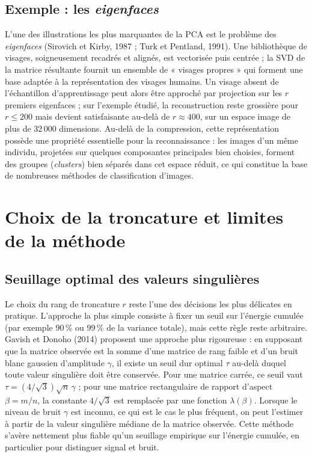 \documentclass[11pt,a4paper]{article}
\begin{document}
\subsection{Exemple : les \emph{eigenfaces}}

L'une des illustrations les plus marquantes de la PCA est le problème des \emph{eigenfaces} (Sirovich et Kirby, 1987 ; Turk et Pentland, 1991). Une bibliothèque de visages, soigneusement recadrés et alignés, est vectorisée puis centrée ; la SVD de la matrice résultante fournit un ensemble de « visages propres » qui forment une base adaptée à la représentation des visages humains. Un visage absent de l'échantillon d'apprentissage peut alors être approché par projection sur les $r$ premiers eigenfaces ; sur l'exemple étudié, la reconstruction reste grossière pour $r \le 200$ mais devient satisfaisante au-delà de $r \approx 400$, sur un espace image de plus de $32\,000$ dimensions. Au-delà de la compression, cette représentation possède une propriété essentielle pour la reconnaissance : les images d'un même individu, projetées sur quelques composantes principales bien choisies, forment des groupes (\emph{clusters}) bien séparés dans cet espace réduit, ce qui constitue la base de nombreuses méthodes de classification d'images.

\section{Choix de la troncature et limites de la méthode}

\subsection{Seuillage optimal des valeurs singulières}

Le choix du rang de troncature $r$ reste l'une des décisions les plus délicates en pratique. L'approche la plus simple consiste à fixer un seuil sur l'énergie cumulée (par exemple $90\,\%$ ou $99\,\%$ de la variance totale), mais cette règle reste arbitraire. Gavish et Donoho (2014) proposent une approche plus rigoureuse : en supposant que la matrice observée est la somme d'une matrice de rang faible et d'un bruit blanc gaussien d'amplitude $\gamma$, il existe un seuil dur optimal $\tau$ au-delà duquel toute valeur singulière doit être conservée. Pour une matrice carrée, ce seuil vaut $\tau = (4/\sqrt3)\sqrt n\,\gamma$ ; pour une matrice rectangulaire de rapport d'aspect $\beta = m/n$, la constante $4/\sqrt3$ est remplacée par une fonction $\lambda(\beta)$. Lorsque le niveau de bruit $\gamma$ est inconnu, ce qui est le cas le plus fréquent, on peut l'estimer à partir de la valeur singulière médiane de la matrice observée. Cette méthode s'avère nettement plus fiable qu'un seuillage empirique sur l'énergie cumulée, en particulier pour distinguer signal et bruit.
\end{document}
